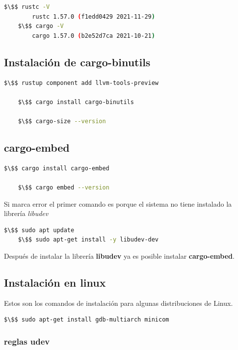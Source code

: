 \begin{lstlisting}[language=bash]
	$\$$ rustc -V
		rustc 1.57.0 (f1edd0429 2021-11-29)
	$\$$ cargo -V
		cargo 1.57.0 (b2e52d7ca 2021-10-21)	
\end{lstlisting} 

\subsection{Instalación de cargo-binutils}

\begin{lstlisting}[language=bash]
	$\$$ rustup component add llvm-tools-preview

	$\$$ cargo install cargo-binutils
		
	$\$$ cargo-size --version
\end{lstlisting} 

\subsection{cargo-embed}

\begin{lstlisting}[language=bash]
	$\$$ cargo install cargo-embed
	
	$\$$ cargo embed --version
\end{lstlisting} 

Si marca error el primer comando es porque el sistema no tiene instalado la librería \textit{libudev}

\begin{lstlisting}[language=bash]
	$\$$ sudo apt update
	$\$$ sudo apt-get install -y libudev-dev
\end{lstlisting} 

Después de instalar la librería \textbf{libudev} ya es posible instalar \textbf{cargo-embed}. 

\subsection{Instalación en linux}

Estos son los comandos de instalación para algunas distribuciones de Linux.

\begin{lstlisting}[language=bash]
	$\$$ sudo apt-get install gdb-multiarch minicom
\end{lstlisting} 

\subsubsection{reglas udev}

